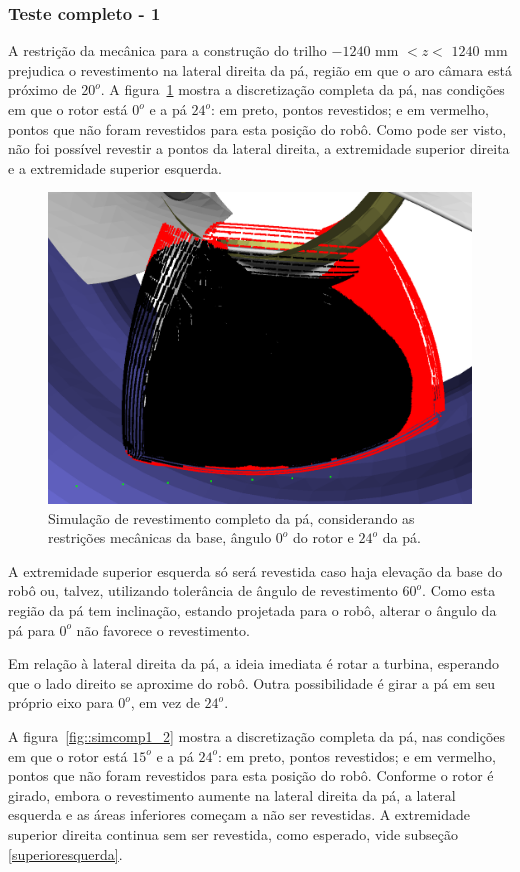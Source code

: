 \subsubsection{Teste completo - 1 }\label{teste1}

A restrição da mecânica para a construção do trilho $-1240$ mm $< z <$ $1240$ mm
prejudica o revestimento na lateral direita da pá, região em que o aro câmara
está próximo de $20^o$. A figura~\ref{fig::simcomp1_1} mostra a
discretização completa da pá, nas condições em que o rotor está $0^o$ e a pá
$24^o$:
em preto, pontos revestidos; e em vermelho, pontos que não foram revestidos para
esta posição do robô. Como pode ser visto, não foi possível revestir a pontos da
lateral direita, a extremidade superior direita e a extremidade superior
esquerda.

\begin{figure}[!ht]
	\centering	
	\includegraphics[width=.5\columnwidth]{figs/simcomp1_1.png}
	\caption{Simulação de revestimento completo da pá, considerando as
	restrições mecânicas da base, ângulo $0^o$ do rotor e $24^o$ da pá.}
	\label{fig::simcomp1_1}
\end{figure}

A extremidade superior esquerda só será revestida caso haja elevação da base do
robô ou, talvez, utilizando tolerância de ângulo de revestimento $60^o$.
Como esta região da pá tem inclinação, estando projetada para o robô, alterar
o ângulo da pá para $0^o$ não favorece o revestimento. 

Em relação à lateral direita da pá, a ideia imediata é rotar a turbina,
esperando que o lado direito se aproxime do robô. Outra possibilidade é girar a
pá em seu próprio eixo para $0^o$, em vez de $24^o$. 

A figura~\ref{fig::simcomp1_2} mostra a discretização completa da pá, nas
condições em que o rotor está $15^o$ e a pá $24^o$: em preto, pontos
revestidos; e em vermelho, pontos que não foram revestidos para esta posição do
robô. Conforme o rotor é girado, embora o revestimento aumente na lateral
direita da pá, a lateral esquerda e as áreas inferiores começam a não ser
revestidas. A extremidade superior direita continua sem ser revestida, como
esperado, vide subseção \ref{superioresquerda}. 

